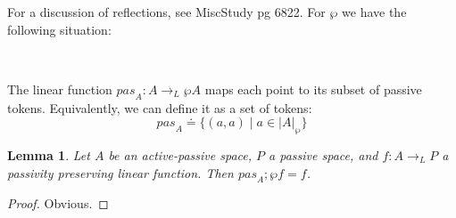 \documentclass{article}
\newtheorem{lemma}{Lemma}
\begin{document}
For a discussion of reflections, see MiscStudy pg 6822. For $\wp$ we have the following situation:

\begin{center}
\\
\end{center}

The linear function $\mathit{pas}_A : A \to_L \wp A$ maps each point to its subset of passive tokens.
Equivalently, we can define it as a set of tokens:
$$\mathit{pas}_A \doteq \{ (a,a) \mid a \in |A|_{\wp} \}$$

\begin{lemma}
Let $A$ be an active-passive space, $P$ a passive space, and $f : A \to_L P$ a passivity preserving linear function. Then $\mathit{pas}_A;\wp f = f$. 
\end{lemma}

\begin{proof}
Obvious.
\end{proof}
\end{document}
